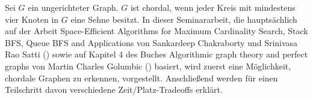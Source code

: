 Sei \( G \) ein ungerichteter Graph. \( G \) ist chordal, wenn jeder Kreis mit mindestens vier Knoten in \( G \) eine Sehne besitzt. In dieser Seminararbeit, die hauptsächlich auf der Arbeit \glqq{}Space-Efficient Algorithms for Maximum Cardinality Search, Stack BFS, Queue BFS and Applications\grqq{} von Sankardeep Chakraborty und Srinivasa Rao Satti (\cite{sankardeep})  sowie auf Kapitel 4 des Buches \glqq{}Algorithmic graph theory and perfect graphs\grqq{} von Martin Charles Golumbic (\cite{golumbic}) basiert, wird zuerst eine Möglichkeit, chordale Graphen zu erkennen, vorgestellt. Anschließend werden für einen Teilschritt davon verschiedene Zeit/Platz-Tradeoffs erklärt.
